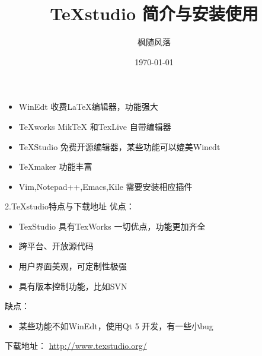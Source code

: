 \documentclass[14pt,notheorems]{beamer}
\newcommand{\mylead}[1]{\textcolor{acolor1}{#1}}
\begin{document}
\title{\TeX studio 简介与安装使用}
\author{枫随风落}
\date{\today}
\begin{frame}[plain]\transboxout
\titlepage
\end{frame}

\begin{frame}\transboxin
\begin{itemize}
	\frametitle{主流\TeX{}编辑器介绍}%
	\item WinEdt 收费\LaTeX{}编辑器，功能强大
	\item TeXworks MikTeX 和TexLive 自带编辑器
	\item TeXStudio 免费开源编辑器，某些功能可以媲美Winedt
	\item TeXmaker 功能丰富
	\item Vim,Notepad++,Emacs,Kile 需要安装相应插件
\end{itemize}
\end{frame}


\begin{frame}{2.\TeX studio特点与下载地址}
\vspace{-1.5cm}
优点：
	\begin{itemize}
		\item TexStudio 具有TexWorks 一切优点，功能更加齐全%
		\item 跨平台、开放源代码
		\item 用户界面美观，可定制性极强
		\item 具有版本控制功能，比如SVN
	\end{itemize}
缺点：
\begin{itemize}
	\item 某些功能不如WinEdt，使用Qt 5 开发，有一些小bug
\end{itemize}
下载地址：
	\url{http://www.texstudio.org/}
	
\end{frame}
\end{document}

